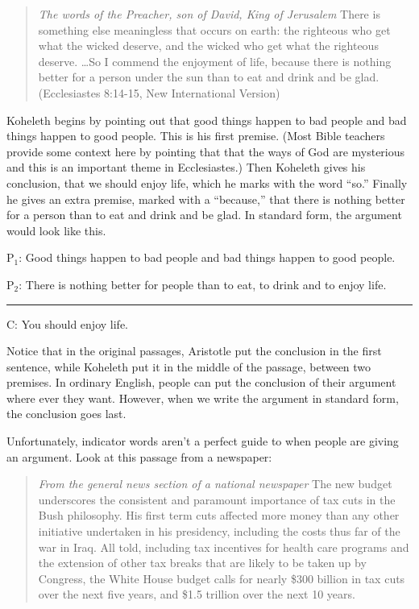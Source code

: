 \begin{quotation}
\noindent \textit{The words of the Preacher, son of David, King of Jerusalem} There is something else meaningless that occurs on earth: the righteous who get what the wicked deserve, and the wicked who get what the righteous deserve. \ldots So I commend the enjoyment of life, because there is nothing better for a person under the sun than to eat and drink and be glad. (Ecclesiastes 8:14-15, New International Version)
\end{quotation}

Koheleth begins by pointing out that good things happen to bad people and bad things happen to good people. This is his first premise. (Most Bible teachers provide some context here by pointing that that the ways of God are mysterious and this is an important theme in Ecclesiastes.) Then Koheleth gives his conclusion, that we should enjoy life, which he marks with the word ``so.'' Finally he gives an extra premise, marked with a ``because,'' that there is nothing better for a person than to eat and drink and be glad. In standard form, the argument would look like this.


\begin{earg}
\item[P$_1$:] Good things happen to bad people and bad things happen to good people.
\item[P$_2$:] There is nothing better for people than to eat, to drink and to enjoy life.
\vspace{-.5em}
\item [] \rule{0.8\linewidth}{.5pt} 
\item[C:] You should enjoy life.
\end{earg} 

Notice that in the original passages, Aristotle put the conclusion in the first sentence, while Koheleth put it in the middle of the passage, between two premises. In ordinary English, people can put the conclusion of their argument where ever they want. However, when we write the argument in standard form, the conclusion goes last.

Unfortunately, indicator words aren't a perfect guide to when people are giving an argument. Look at this passage from a newspaper:

\begin{quotation}
\noindent \textit{From the general news section of a national newspaper} The new budget underscores the consistent and paramount importance of tax cuts in the Bush philosophy. His first term cuts affected more money than any other initiative undertaken in his presidency, including the costs thus far of the war in Iraq. All told, including tax incentives for health care programs and the extension of other tax breaks that are likely to be taken up by Congress, the White House budget calls for nearly \$300 billion in tax cuts over the next five years, and \$1.5 trillion over the next 10 years.  \citep{Toner2006}
\end{quotation}

